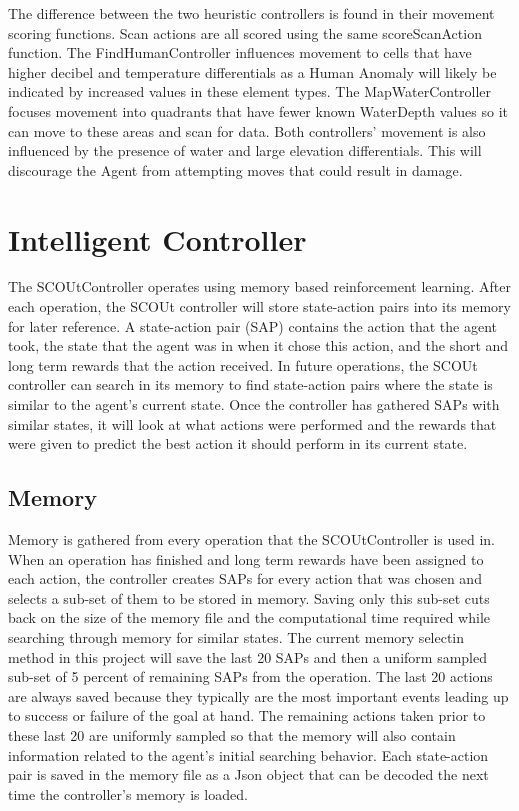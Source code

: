 The difference between the two heuristic controllers is found in their movement scoring functions.
Scan actions are all scored using the same scoreScanAction function.
The FindHumanController influences movement to cells that have higher decibel and temperature differentials as a Human Anomaly will likely be indicated by increased values in these element types.
The MapWaterController focuses movement into quadrants that have fewer known WaterDepth values so it can move to these areas and scan for data.
Both controllers' movement is also influenced by the presence of water and large elevation differentials.
This will discourage the Agent from attempting moves that could result in damage.


\section{Intelligent Controller}
The SCOUtController operates using memory based reinforcement learning.
After each operation, the SCOUt controller will store state-action pairs into its memory for later reference.
A state-action pair (SAP) contains the action that the agent took, the state that the agent was in when it chose this action, and the short and long term rewards that the action received.
In future operations, the SCOUt controller can search in its memory to find state-action pairs where the state is similar to the agent's current state.
Once the controller has gathered SAPs with similar states, it will look at what actions were performed and the rewards that were given to predict the best action it should perform in its current state.


\subsection{Memory}
Memory is gathered from every operation that the SCOUtController is used in.
When an operation has finished and long term rewards have been assigned to each action, the controller creates SAPs for every action that was chosen and selects a sub-set of them to be stored in memory.
Saving only this sub-set cuts back on the size of the memory file and the computational time required while searching through memory for similar states.
The current memory selectin method in this project will save the last 20 SAPs and then a uniform sampled sub-set of 5 percent of remaining SAPs from the operation.
The last 20 actions are always saved because they typically are the most important events leading up to success or failure of the goal at hand.
The remaining actions taken prior to these last 20 are uniformly sampled so that the memory will also contain information related to the agent's initial searching behavior.
Each state-action pair is saved in the memory file as a Json object that can be decoded the next time the controller's memory is loaded.



